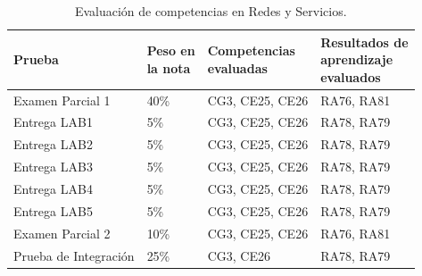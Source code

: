 \documentclass[xcolor=table,xcolor=x11names]{beamer}
\begin{document}
\begin{frame}{\subsecname}

\begin{table}
    \small
    \centering
\begin{tabular}{ p{3cm} | p{1.25cm} | p{3cm} | p{2cm} }
    \toprule
\textbf{Prueba} & \makecell{\bf Peso en \\ \bf la nota} & \makecell{\bf Competencias\\\bf evaluadas} & \makecell{\bf Resultados de \\\bf aprendizaje \\\bf evaluados} \\ \midrule
 \rowcolor{upmblue!20} Examen Parcial 1 & 40\% & CG3, CE25, CE26 & RA76, RA81 \\ 
Entrega LAB1 & 5\% & CG3, CE25, CE26 & RA78, RA79 \\ 
 \rowcolor{upmblue!20} Entrega LAB2 & 5\% & CG3, CE25, CE26 & RA78, RA79 \\ 
Entrega LAB3 & 5\% & CG3, CE25, CE26 & RA78, RA79 \\ 
 \rowcolor{upmblue!20} Entrega LAB4 & 5\% & CG3, CE25, CE26 & RA78, RA79 \\ 
Entrega LAB5 & 5\% & CG3, CE25, CE26 & RA78, RA79 \\ 
 \rowcolor{upmblue!20} Examen Parcial 2 & 10\% & CG3, CE25, CE26 & RA76, RA81 \\ 
Prueba de Integración & 25\% & CG3, CE26 & RA78, RA79 \\ \bottomrule
\end{tabular}
\caption{Evaluación de competencias en Redes y Servicios.}
\label{table:evaluacion-competencias-rser}
\end{table}
\end{frame}
\end{document}
